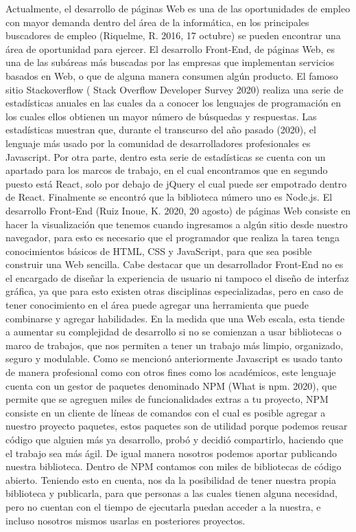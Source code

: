Actualmente, el desarrollo de páginas Web es una de las oportunidades de empleo con mayor demanda dentro del área de la informática, en los principales buscadores de empleo  \cite{work} (Riquelme, R. 2016, 17 octubre) se pueden encontrar una área de oportunidad para ejercer. El desarrollo Front-End, de páginas Web, es una de las subáreas más buscadas por las empresas que implementan servicios basados en Web, o que de alguna manera consumen algún producto. 
El famoso sitio Stackoverflow  \cite{stackOverflow} ( Stack Overflow Developer Survey 2020) realiza una serie de estadísticas anuales en las cuales da a conocer los lenguajes de programación en los cuales ellos obtienen un mayor número de búsquedas y respuestas. Las estadísticas muestran que, durante el transcurso del año pasado (2020), el lenguaje más usado por la comunidad de desarrolladores profesionales es Javascript. 
Por otra parte, dentro esta serie de estadísticas se cuenta con un apartado para los marcos de trabajo, en el cual encontramos que en segundo puesto está React, solo por debajo de jQuery el cual puede ser empotrado dentro de React.  Finalmente se encontró que la biblioteca número uno es Node.js. 
El desarrollo Front-End  \cite{frontEnd} (Ruiz Inoue, K. 2020, 20 agosto) de páginas Web consiste en hacer la visualización que tenemos cuando ingresamos a algún sitio desde nuestro navegador, para esto es necesario que el programador que realiza la tarea tenga conocimientos básicos de HTML, CSS y JavaScript, para que sea posible construir una Web sencilla. Cabe destacar que un desarrollador Front-End no es el encargado de diseñar la experiencia de usuario ni tampoco el diseño de interfaz gráfica, ya que para esto existen otras disciplinas especializadas, pero en caso de tener conocimiento en el área puede agregar una herramienta que puede combinarse y agregar habilidades.
\newline
En la medida que una Web escala, esta tiende a aumentar su complejidad de desarrollo si no se comienzan a usar bibliotecas o marco de trabajos, que nos permiten a tener un trabajo más limpio, organizado, seguro y modulable. 
Como se mencionó anteriormente Javascript es usado tanto de manera profesional como con otros fines como los académicos, este lenguaje cuenta con un gestor de paquetes denominado NPM  \cite{npm} (What is npm. 2020),  que permite que se agreguen miles de funcionalidades extras a tu proyecto, NPM consiste en un cliente de líneas de comandos con el cual es posible agregar a nuestro proyecto paquetes, estos paquetes son de utilidad porque podemos reusar código que alguien más ya desarrollo, probó y decidió compartirlo, haciendo que el trabajo sea más ágil.  De igual manera nosotros podemos aportar publicando nuestra biblioteca. Dentro de NPM contamos con miles de bibliotecas de código abierto.  
Teniendo esto en cuenta, nos da la posibilidad de tener nuestra propia biblioteca y publicarla, para que personas a las cuales tienen alguna necesidad, pero no cuentan con el tiempo de ejecutarla puedan acceder a la nuestra, e incluso nosotros mismos usarlas en posteriores proyectos. 

